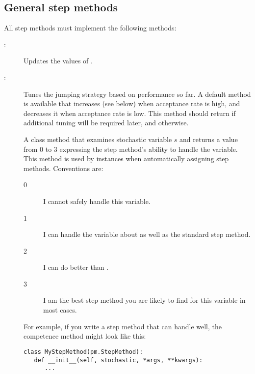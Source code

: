 \subsection{General step methods} \label{user-gen}

All step methods must implement the following methods:
\begin{description}
   \item[:] Updates the values of .
   \item[:] Tunes the jumping strategy based on performance so far. A default method is available that increases  (see below) when acceptance rate is high, and decreases it when acceptance rate is low. This method should return  if additional tuning will be required later, and  otherwise.
   \item[] A class method that examines stochastic variable $s$ and returns a value from 0 to 3 expressing the step method's ability to handle the variable. This method is used by  instances when automatically assigning step methods. Conventions are:
   \begin{description}
      \item[0] I cannot safely handle this variable. 
      \item[1] I can handle the variable about as well as the standard  step method.
      \item[2] I can do better than .
      \item[3] I am the best step method you are likely to find for this variable in most cases.
   \end{description}
   For example, if you write a step method that can handle  well, the competence method might look like this:
\begin{verbatim}
class MyStepMethod(pm.StepMethod):
   def __init__(self, stochastic, *args, **kwargs):
      ...
   

\end{verbatim}
\end{description}
